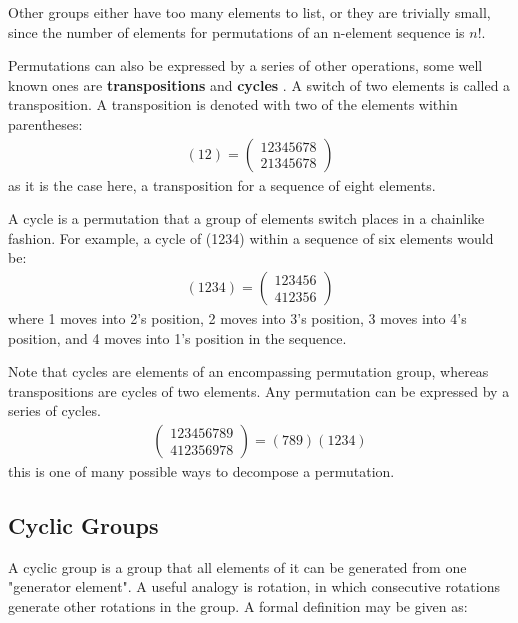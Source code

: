 Other groups either have too many elements to list, or they are trivially small, since the number of elements for permutations of an n-element sequence is $n!$.

Permutations can also be expressed by a series of other operations, some well known ones are  \textbf{transpositions}  and \textbf{cycles} . A switch of two elements is called a transposition. A transposition is denoted with two of the elements within parentheses:
\begin{align}
(12) = \left(\begin{matrix}12345678\\21345678\end{matrix}\right)
\end{align}
as it is the case here, a transposition for a sequence of eight elements.

A cycle is a permutation that a group of elements switch places in a chainlike fashion. For example, a cycle of (1234) within a sequence of six elements would be:
%
\begin{align}
(1234) = \left(\begin{matrix}123456\\412356\end{matrix}\right)
\end{align}
%
where 1 moves into 2's position, 2 moves into 3's position, 3 moves into 4's position, and 4 moves into 1's position in the sequence. 

Note that cycles are elements of an encompassing permutation group, whereas transpositions are cycles of two elements. Any permutation can be expressed by a series of cycles.
%
\begin{align}
\left(\begin{matrix}123456789\\412356978\end{matrix}\right) = (789)(1234)
\end{align}
%
this is one of many possible ways to decompose a permutation.
%
\subsection{Cyclic Groups}
A cyclic group is a group that all elements of it can be generated from one "generator element". A useful analogy is rotation, in which consecutive rotations generate other rotations in the group. A formal definition may be given as:
\cite{rosen_symmetry_1995}

